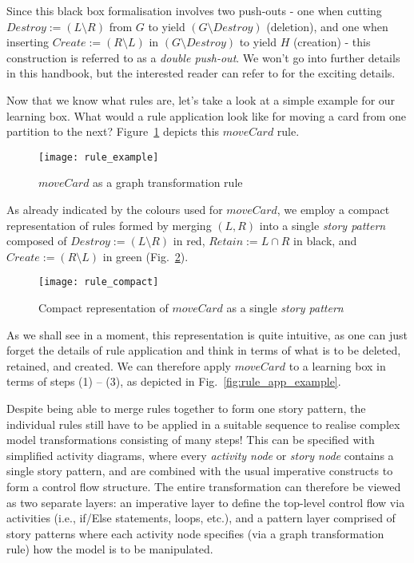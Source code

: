 Since this black box formalisation involves two push-outs - one when cutting $Destroy := (L\setminus R)$ from $G$ to yield $(G\setminus Destroy)$ (deletion),
and one when inserting $Create := (R\setminus L)$ in $(G\setminus Destroy)$ to yield $H$ (creation) - this construction is referred to as a \emph{double
push-out}. We won't go into further details in this handbook, but the interested reader can refer to \cite{EEPT06} for the exciting details.

Now that we know what rules are, let's take a look at a simple example for our learning box. What would a rule application look like for moving a card from
one partition to the next? Figure~\ref{fig:rule_example} depicts this $moveCard$ rule.
  
\begin{figure}[htp]
\begin{center}
  \texttt{[image: rule\_example]}
  \caption[]{$moveCard$ as a graph transformation rule}	
  \label{fig:rule_example}
\end{center}
\end{figure}


As already indicated by the colours used for $moveCard$, we employ a compact representation of rules formed by merging $(L,R)$ into a single \emph{story
pattern} composed of  $Destroy := (L\setminus R)$ in red, $Retain :=  L\cap R$ in black, and $Create := (R\setminus L)$ in green
(Fig.~\ref{fig:rule_compact}).

\begin{figure}[htp]
\begin{center}
  \texttt{[image: rule\_compact]}
  \caption[]{Compact representation of $moveCard$ as a single \emph{story pattern}}
  \label{fig:rule_compact}
\end{center}
\end{figure}

As we shall see in a moment, this  representation is quite intuitive, as one can just forget the details of rule application and think in terms of what is to be
deleted, retained, and created. We can therefore apply $moveCard$ to a learning box in terms of steps (1) -- (3), as depicted in Fig.~\ref{fig:rule_app_example}.

Despite being able to merge rules together to form one story pattern, the individual rules still have to be applied in a suitable sequence to realise
complex model transformations consisting of many steps! This can be specified with simplified activity diagrams, where every \emph{activity node} or
\emph{story node} contains a single story pattern, and are combined with the usual imperative constructs to form a control flow structure. The entire
transformation can therefore be viewed as two separate layers: an imperative layer to define the top-level control flow via activities (i.e., if/Else
statements, loops, etc.), and a pattern layer comprised of story patterns where each activity node specifies (via a graph transformation rule) how the model is to be
manipulated.

